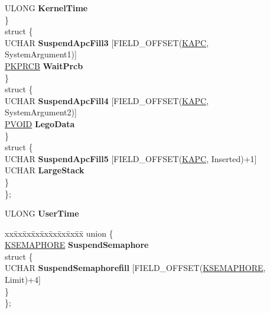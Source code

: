 \begin{DoxyCompactItemize}
\begin{tabbing}
\>\>ULONG {\bfseries KernelTime}\\
\>\} \\
\mbox{\label{union___k_t_h_r_e_a_d_1_1_0D2104_a48acc41086f3af44ce8370b5561d2913}} 
\>struct \{\\
\>\>UCHAR {\bfseries SuspendApcFill3} \mbox{[}FIELD\_OFFSET(\hyperlink{struct___k_a_p_c}{KAPC}, \\
\>\>\>SystemArgument1)\mbox{]}\\
\>\>\hyperlink{struct___k_p_r_c_b}{PKPRCB} {\bfseries WaitPrcb}\\
\>\} \\
\mbox{\label{union___k_t_h_r_e_a_d_1_1_0D2104_a43a61b8c68298a7ffa0268dd6f1b5a89}} 
\>struct \{\\
\>\>UCHAR {\bfseries SuspendApcFill4} \mbox{[}FIELD\_OFFSET(\hyperlink{struct___k_a_p_c}{KAPC}, \\
\>\>\>SystemArgument2)\mbox{]}\\
\>\>\hyperlink{interfacevoid}{PVOID} {\bfseries LegoData}\\
\>\} \\
\mbox{\label{union___k_t_h_r_e_a_d_1_1_0D2104_aca604f88020b476a8ada6893ecf338c1}} 
\>struct \{\\
\>\>UCHAR {\bfseries SuspendApcFill5} \mbox{[}FIELD\_OFFSET(\hyperlink{struct___k_a_p_c}{KAPC}, Inserted)+1\mbox{]}\\
\>\>UCHAR {\bfseries LargeStack}\\
\>\} \\
\}; \\

\end{tabbing}\item 
\mbox{\label{struct___k_t_h_r_e_a_d_af9613faf3efeb3693c4193247f160357}} 
U\+L\+O\+NG {\bfseries User\+Time}
\item 
\mbox{\label{struct___k_t_h_r_e_a_d_a60324672f09c6d0acc68dc9c8e83eede}} 
\begin{tabbing}
xx\=xx\=xx\=xx\=xx\=xx\=xx\=xx\=xx\=\kill
union \{\\
\>\hyperlink{struct___k_s_e_m_a_p_h_o_r_e}{KSEMAPHORE} {\bfseries SuspendSemaphore}\\
\mbox{\label{union___k_t_h_r_e_a_d_1_1_0D2106_a7e417c41395e4f2b6b61890f4e3496d5}} 
\>struct \{\\
\>\>UCHAR {\bfseries SuspendSemaphorefill} \mbox{[}FIELD\_OFFSET(\hyperlink{struct___k_s_e_m_a_p_h_o_r_e}{KSEMAPHORE}, Limit)+4\mbox{]}\\
\>\} \\
\}; \\


\end{tabbing}
\end{DoxyCompactItemize}
